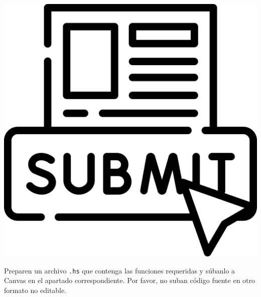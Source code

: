 \documentclass[]{article}
\theoremstyle{definition}
\begin{document}
\begin{minipage}{0.1\linewidth}
	\centering
	\includegraphics[scale = 0.06]{../img/submit}
\end{minipage}%
\begin{minipage}{0.85\linewidth}
	Preparen un archivo \texttt{.hs} que contenga las funciones requeridas y súbanlo a Canvas en el apartado correspondiente.
	Por favor, no suban código fuente en otro formato no editable.
\end{minipage}

\vfill
\end{document}
